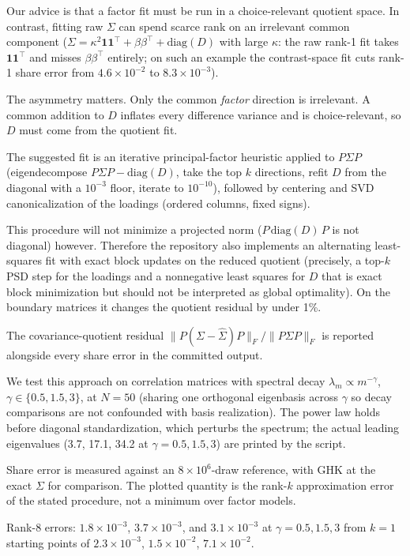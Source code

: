 \documentclass[12pt]{article}
\theoremstyle{remark}
\begin{document}
Our advice is that a factor fit must be run in a choice-relevant
quotient space. In contrast, fitting raw $\Sigma$ can spend
scarce rank on an irrelevant common component ($\Sigma = \kappa^2
\mathbf{1}\mathbf{1}^\top + \beta\beta^\top + \mathrm{diag}(D)$ with large $\kappa$: the
raw rank-1 fit takes $\mathbf{1}\mathbf{1}^\top$ and misses
$\beta\beta^\top$ entirely; on such an example the contrast-space fit cuts
rank-1 share error from $4.6\times10^{-2}$ to $8.3\times10^{-3}$).

The asymmetry matters. Only the common \emph{factor} direction is
irrelevant. A common addition to $D$ inflates every difference variance
and is choice-relevant, so $D$ must come from the quotient fit.

The suggested fit is an iterative principal-factor heuristic applied to $P\Sigma P$ (eigendecompose
$P\Sigma P - \mathrm{diag}(D)$, take the top $k$ directions, refit $D$ from
the diagonal with a $10^{-3}$ floor, iterate to $10^{-10}$), followed by
centering and SVD canonicalization of the loadings (ordered columns, fixed
signs).

This procedure will not minimize a projected norm ($P\,\mathrm{diag}(D)\,P$
is not diagonal) however. Therefore the repository also implements an alternating least-squares fit with
exact block updates on the reduced quotient (precisely, a top-$k$ PSD step for the
loadings and a nonnegative least squares for $D$ that is exact block
minimization but should not be interpreted as global optimality). On
the boundary matrices it changes the quotient residual by under 1\%.

The covariance-quotient residual $\|P(\Sigma -
\hat\Sigma)P\|_F / \|P\Sigma P\|_F$ is reported alongside every share
error in the committed output.

We test this approach on correlation matrices with spectral decay
$\lambda_m \propto m^{-\gamma}$, $\gamma \in \{0.5, 1.5, 3\}$, at
$N=50$ (sharing one
orthogonal eigenbasis across $\gamma$ so decay comparisons are not
confounded with basis realization). The power law holds before diagonal
standardization, which perturbs the spectrum; the actual leading eigenvalues
(3.7, 17.1, 34.2 at $\gamma = 0.5, 1.5, 3$) are printed by the script.

Share error is measured against an $8\times10^6$-draw reference, with GHK
at the exact $\Sigma$ for comparison. The plotted quantity is the rank-$k$
approximation error of the stated procedure, not a minimum over factor
models.

Rank-8 errors: $1.8\times10^{-3}$, $3.7\times10^{-3}$, and
$3.1\times10^{-3}$ at $\gamma = 0.5, 1.5, 3$ from $k=1$ starting points of
$2.3\times10^{-3}$, $1.5\times10^{-2}$, $7.1\times10^{-2}$.
\end{document}
